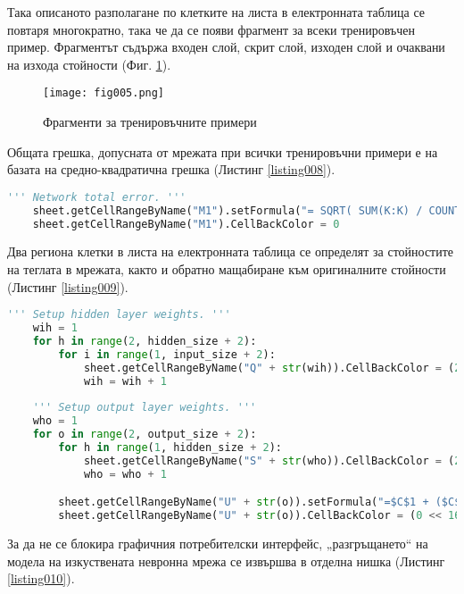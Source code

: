 Така описаното разполагане по клетките на листа в електронната таблица се повтаря многократно, така че да се появи фрагмент за всеки тренировъчен пример. Фрагментът съдържа входен слой, скрит слой, изходен слой и очаквани на изхода стойности (Фиг. \ref{fig005}).

\begin{figure}[h]
  \centering
  \texttt{[image: fig005.png]}
  \caption{Фрагменти за тренировъчните примери}
\label{fig005}
\end{figure}

Общата грешка, допусната от мрежата при всички тренировъчни примери е на базата на средно-квадратична грешка (Листинг \ref{listing008}).

\begin{lstlisting}[caption=Обща средно-квадратична грешка на мрежата, language=Python, basicstyle=\tiny, label=listing008]
    ''' Network total error. '''
    sheet.getCellRangeByName("M1").setFormula("= SQRT( SUM(K:K) / COUNT(K:K) )")
    sheet.getCellRangeByName("M1").CellBackColor = 0
\end{lstlisting}

Два региона клетки в листа на електронната таблица се определят за стойностите на теглата в мрежата, както и обратно мащабиране към оригиналните стойности (Листинг \ref{listing009}).

\begin{lstlisting}[caption=Определяне на региони за теглата на мрежата, language=Python, basicstyle=\tiny, label=listing009]
    ''' Setup hidden layer weights. '''
    wih = 1
    for h in range(2, hidden_size + 2):
        for i in range(1, input_size + 2):
            sheet.getCellRangeByName("Q" + str(wih)).CellBackColor = (255 << 16 | 0 << 8 | 255)
            wih = wih + 1
        
    ''' Setup output layer weights. '''
    who = 1
    for o in range(2, output_size + 2):
        for h in range(1, hidden_size + 2):
            sheet.getCellRangeByName("S" + str(who)).CellBackColor = (255 << 16 | 0 << 8 | 255)
            who = who + 1

        sheet.getCellRangeByName("U" + str(o)).setFormula("=$C$1 + ($C$2 - $C$1) * ((T" + str(o) + " - $C$4) / ($C$5 - $C$4))")
        sheet.getCellRangeByName("U" + str(o)).CellBackColor = (0 << 16 | 127 << 8 | 0)
\end{lstlisting}

За да не се блокира графичния потребителски интерфейс, „разгръщането“ на модела на изкуствената невронна мрежа се извършва в отделна нишка (Листинг \ref{listing010}).

